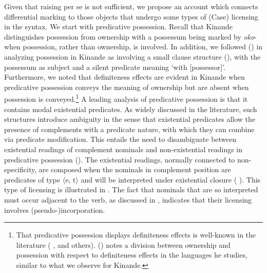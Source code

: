 \documentclass[output=paper]{langscibook}
\begin{document}
Given that raising per se is not sufficient, we propose an account which connects differential marking to those objects that undergo some types of (Case) licensing in the syntax. We start with predicative possession. Recall that Kinande distinguishes possession from ownership with a possessum being marked by \textit{oko}- when possession, rather than ownership, is involved. In addition, we followed \citeauthor{SchneiderZiogaMutaka2019a} (\citeyear{SchneiderZiogaMutaka2019a}) in analyzing possession in Kinande as involving a small clause structure (), with the possessum as subject and a silent predicate meaning ‘with [possessor]'. Furthermore, we noted that definiteness effects are evident in Kinande when predicative possession conveys the meaning of ownership but are absent when possession is conveyed.\footnote{That predicative possession displays definiteness effects is well-known in the literature (\citeauthor{Partee1999} \citeyear{Partee1999}, and others). \citeauthor{Myler2016} (\citeyear{Myler2016}) notes a division between ownership and possession with respect to definiteness effects in the languages he studies, similar to what we observe for Kinande.}
A leading analysis of predicative possession is that it contains modal existential predicates. As widely discussed in the literature, such structures introduce ambiguity in the sense that existential predicates allow the presence of complements with a predicate nature, with which they can combine via predicate modification. This entails the need to disambiguate between existential readings of complement nominals and non-existential readings in predicative possession \citeauthor{Lopez2012} (\citeyear{Lopez2012}). The existential readings, normally connected to non-specificity, are composed when the nominals in complement position are predicates of type $\langle\text{e, t}\rangle$ and will be interpreted under existential closure (\citeauthor{Diesing1992} \citeyear{Diesing1992}). This type of licensing is illustrated in . The fact that nominals that are so interpreted must occur adjacent to the verb, as discussed in , indicates that their licensing involves \mbox{(pseudo-)}incorporation.
\end{document}
